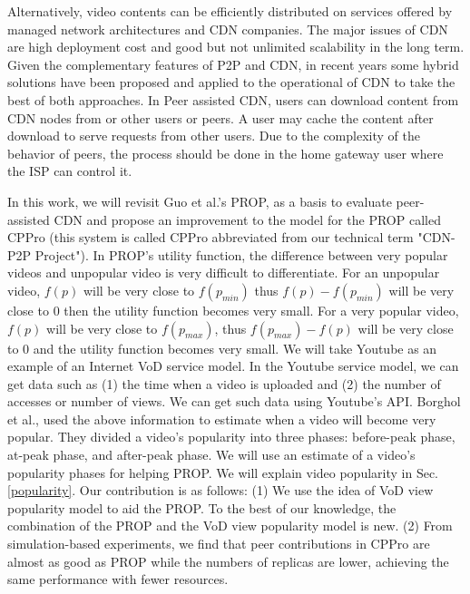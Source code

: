 Alternatively, video contents can be efficiently distributed on services offered by managed network architectures and CDN companies.
The major issues of CDN are high deployment cost and good but not unlimited scalability in the long term.  
Given the complementary features of P2P and CDN, in recent years some hybrid solutions have been proposed and applied to the operational of CDN \cite{Huang:2008:UHC:1496046.1496064,4772628,Yin:2009:DDH:1631272.1631279} to take the best of both approaches.
In Peer assisted CDN, users can download content from CDN nodes from or other users or peers. 
A user may cache the content after download to serve requests from other users. 
Due to the complexity of the behavior of peers, the process should be done in the home gateway user where the ISP can control it.

In this work, we will revisit Guo et al.'s PROP, \cite{1613869} as a basis to evaluate peer-assisted CDN and propose an improvement to the model for the PROP called CPPro (this system is called CPPro abbreviated from our technical term "CDN-P2P Project").
In PROP's utility function, the difference between very popular videos and unpopular video is very difficult to differentiate. 
For an unpopular video, $f(p)$ will be very close to $f(p_{min})$ thus $f(p) - f(p_{min})$ will be very close to $0$ then the utility function becomes very small.
For a very popular video, $f(p)$ will be very close to $f(p_{max})$, thus $f(p_{max}) - f(p)$ will be very close to $0$ and the  utility function becomes very small.  
We will take Youtube as an example of an Internet VoD service model.
In the Youtube service model, we can get data such as (1) the time when a video is uploaded and (2) the number of accesses or number of views.
We can get such data using Youtube's API.
Borghol et al., \cite{Borghol:2011:CMP:2039452.2039717} used the above information to estimate when a video will become very popular.
They divided a video's popularity into three phases: before-peak phase, at-peak phase, and after-peak phase.
We will use an estimate of a video's popularity phases for helping PROP.
We will explain video popularity in Sec.\ref{popularity}.
Our contribution is as follows:
(1) We use the idea of VoD view popularity model to aid the PROP. 
To the best of our knowledge, the combination of the PROP and the VoD view popularity model is new.
(2) From simulation-based experiments, we find that peer contributions in CPPro are almost as good as  PROP while the numbers of replicas are lower, achieving the same performance with fewer resources.


